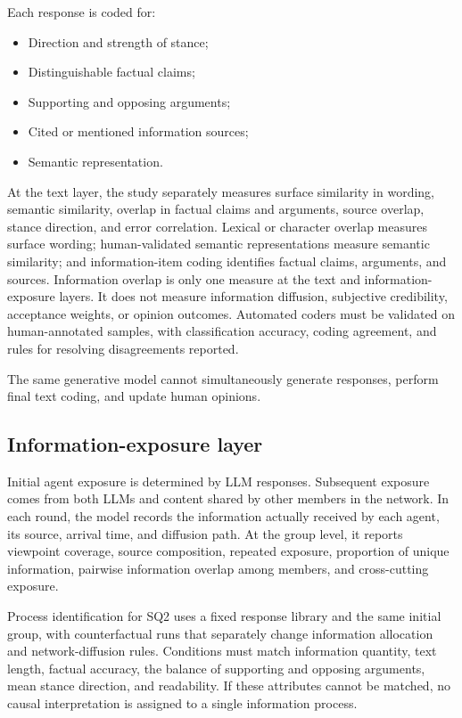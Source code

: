 \documentclass[11pt,a4paper]{article}
\begin{document}
Each response is coded for:

\begin{itemize}
\item Direction and strength of stance;
\item Distinguishable factual claims;
\item Supporting and opposing arguments;
\item Cited or mentioned information sources;
\item Semantic representation.
\end{itemize}

At the text layer, the study separately measures surface similarity in wording, semantic similarity, overlap in factual claims and arguments, source overlap, stance direction, and error correlation. Lexical or character overlap measures surface wording; human-validated semantic representations measure semantic similarity; and information-item coding identifies factual claims, arguments, and sources. Information overlap is only one measure at the text and information-exposure layers. It does not measure information diffusion, subjective credibility, acceptance weights, or opinion outcomes. Automated coders must be validated on human-annotated samples, with classification accuracy, coding agreement, and rules for resolving disagreements reported.

The same generative model cannot simultaneously generate responses, perform final text coding, and update human opinions.

\subsection{Information-exposure layer}

Initial agent exposure is determined by LLM responses. Subsequent exposure comes from both LLMs and content shared by other members in the network. In each round, the model records the information actually received by each agent, its source, arrival time, and diffusion path. At the group level, it reports viewpoint coverage, source composition, repeated exposure, proportion of unique information, pairwise information overlap among members, and cross-cutting exposure.

Process identification for SQ2 uses a fixed response library and the same initial group, with counterfactual runs that separately change information allocation and network-diffusion rules. Conditions must match information quantity, text length, factual accuracy, the balance of supporting and opposing arguments, mean stance direction, and readability. If these attributes cannot be matched, no causal interpretation is assigned to a single information process.
\end{document}
